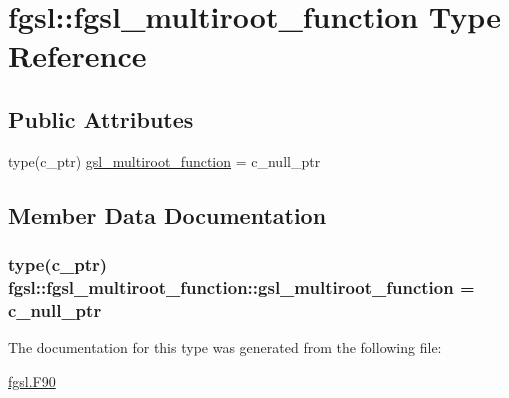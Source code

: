 \hypertarget{structfgsl_1_1fgsl__multiroot__function}{\section{fgsl\-:\-:fgsl\-\_\-multiroot\-\_\-function Type Reference}
\label{structfgsl_1_1fgsl__multiroot__function}
}
\subsection*{Public Attributes}
\begin{DoxyCompactItemize}
\item 
type(c\-\_\-ptr) \hyperlink{structfgsl_1_1fgsl__multiroot__function_a15fe7f7961e40dc0ac6a1de10cc8343f}{gsl\-\_\-multiroot\-\_\-function} = c\-\_\-null\-\_\-ptr
\end{DoxyCompactItemize}


\subsection{Member Data Documentation}
\hypertarget{structfgsl_1_1fgsl__multiroot__function_a15fe7f7961e40dc0ac6a1de10cc8343f}{
\subsubsection[{gsl\-\_\-multiroot\-\_\-function}]{\setlength{\rightskip}{0pt plus 5cm}type(c\-\_\-ptr) fgsl\-::fgsl\-\_\-multiroot\-\_\-function\-::gsl\-\_\-multiroot\-\_\-function = c\-\_\-null\-\_\-ptr}}\label{structfgsl_1_1fgsl__multiroot__function_a15fe7f7961e40dc0ac6a1de10cc8343f}


The documentation for this type was generated from the following file\-:\begin{DoxyCompactItemize}
\item 
\hyperlink{fgsl_8F90}{fgsl.\-F90}\end{DoxyCompactItemize}
